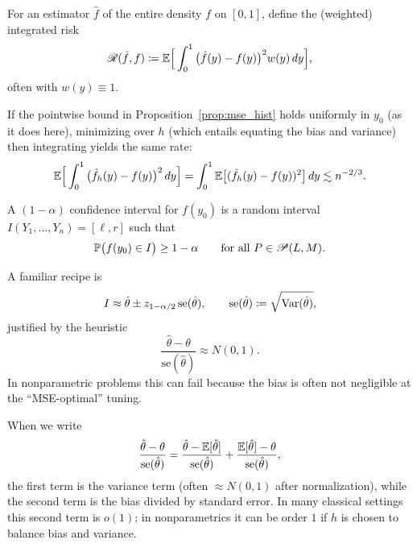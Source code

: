 \begin{definition}
	For an estimator $\hat f$ of the entire density $f$ on $[0,1]$, define the (weighted) integrated risk
	\[
		\mathscr R(\hat f,f)
		\coloneqq
		\E\Big[\int_0^1 \big(\hat f(y)-f(y)\big)^2 w(y)\,dy\Big],
	\]
	often with $w(y)\equiv 1$.
\end{definition}

\begin{remark}	If the pointwise bound in Proposition~\ref{prop:mse_hist} holds uniformly in $y_0$ (as it does here), minimizing over $h$ (which entails equating the bias and variance) 
	then integrating yields the same rate:
	\[
		\E\Big[\int_0^1 \big(\hat f_h(y)-f(y)\big)^2\,dy\Big]
		=
		\int_0^1 \E\big[(\hat f_h(y)-f(y))^2\big]\,dy
		\lesssim
		n^{-2/3}.
	\]
\end{remark}

\begin{definition}
	A $(1-\alpha)$ confidence interval for $f(y_0)$ is a random interval $I(Y_1,\dots,Y_n)=[\ell,r]$ such that
	\[
		\P\big(f(y_0)\in I\big)\ge 1-\alpha
		\qquad
		\text{for all } P\in\mathscr P(L,M).
	\]
\end{definition}

\begin{remark}
	A familiar recipe is
	\[
		I \approx \hat\theta \pm z_{1-\alpha/2}\,\mathrm{se}(\hat\theta),
		\qquad
		\mathrm{se}(\hat\theta)\coloneqq\sqrt{\Var(\hat\theta)},
	\]
	justified by the heuristic
	\[
		\frac{\hat\theta-\theta}{\mathrm{se}(\hat\theta)}\approx N(0,1).
	\]
	In nonparametric problems this can fail because the bias is often not negligible at the ``MSE-optimal'' tuning.
\end{remark}

\begin{remark}
	When we write
	\[
		\frac{\hat\theta-\theta}{\mathrm{se}(\hat\theta)}
		=
		\frac{\hat\theta-\E[\hat\theta]}{\mathrm{se}(\hat\theta)}
		+
		\frac{\E[\hat\theta]-\theta}{\mathrm{se}(\hat\theta)},
	\]
	the first term is the variance term (often $\approx N(0,1)$ after normalization), while 
	the second term is the bias divided by standard error.
	In many classical settings this second term is $o(1)$; in nonparametrics it can be order $1$ if $h$ is chosen
	to balance bias and variance.
\end{remark}


